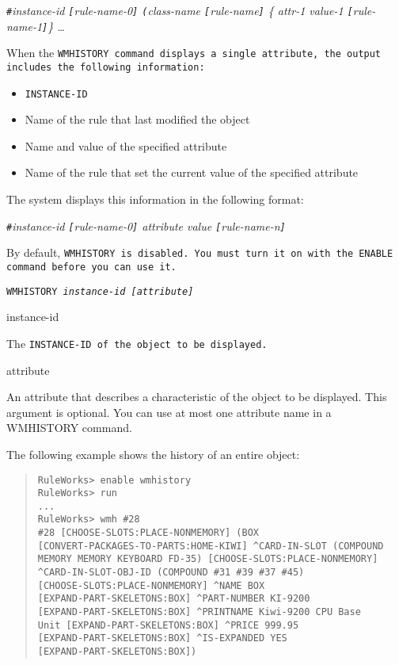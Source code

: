{{\verb|#|\it{instance-id} \verb|[|\it{rule-name-0}\verb|]| \verb|(|\it{class-name} \verb|[|rule-name\verb|]| \{ \ct\it{attr-1} \it{value-1} \verb|[|\it{rule-name-1}\verb|]|\} \ldots

When the \tt{WMHISTORY} command displays a single attribute, the
output includes the following information:

\begin{itemize}
\item \tt{INSTANCE-ID}
\item Name of the rule that last modified the object
\item Name and value of the specified attribute
\item Name of the rule that set the current value of the specified
  attribute
\end{itemize}

The system displays this information in the following format:

\verb|#|\it{instance-id} \verb|[|\it{rule-name-0}\verb|]| \ct\it{attribute} \it{value} \verb|[|\it{rule-name-n}\verb|]|

\begin{note}
  By default, \tt{WMHISTORY} is disabled. You must turn it on with the
  \tt{ENABLE} command before you can use it.
\end{note}

\Format

\tt{WMHISTORY} \it{instance-id} [\ct\it{attribute}]

\begin{arguments}
\item[instance-id]

  The \tt{INSTANCE-ID} of the object to be displayed.

\item[attribute]

  An attribute that describes a characteristic of the object to be
  displayed. This argument is optional. You can use at most one
  attribute name in a WMHISTORY command.
\end{arguments}

\Example

The following example shows the history of an entire object:

\begin{quote}
\begin{verbatim}
RuleWorks> enable wmhistory
RuleWorks> run
...
RuleWorks> wmh #28
#28 [CHOOSE-SLOTS:PLACE-NONMEMORY] (BOX
[CONVERT-PACKAGES-TO-PARTS:HOME-KIWI] ^CARD-IN-SLOT (COMPOUND
MEMORY MEMORY KEYBOARD FD-35) [CHOOSE-SLOTS:PLACE-NONMEMORY]
^CARD-IN-SLOT-OBJ-ID (COMPOUND #31 #39 #37 #45)
[CHOOSE-SLOTS:PLACE-NONMEMORY] ^NAME BOX
[EXPAND-PART-SKELETONS:BOX] ^PART-NUMBER KI-9200
[EXPAND-PART-SKELETONS:BOX] ^PRINTNAME Kiwi-9200 CPU Base
Unit [EXPAND-PART-SKELETONS:BOX] ^PRICE 999.95
[EXPAND-PART-SKELETONS:BOX] ^IS-EXPANDED YES
[EXPAND-PART-SKELETONS:BOX])
\end{verbatim}
\end{quote}

}}
